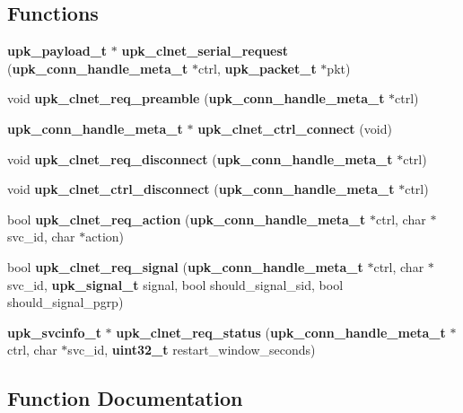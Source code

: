 \subsection*{Functions}
\begin{DoxyCompactItemize}
\item 
{\bf upk\_\-payload\_\-t} $\ast$ {\bf upk\_\-clnet\_\-serial\_\-request} ({\bf upk\_\-conn\_\-handle\_\-meta\_\-t} $\ast$ctrl, {\bf upk\_\-packet\_\-t} $\ast$pkt)
\item 
void {\bf upk\_\-clnet\_\-req\_\-preamble} ({\bf upk\_\-conn\_\-handle\_\-meta\_\-t} $\ast$ctrl)
\item 
{\bf upk\_\-conn\_\-handle\_\-meta\_\-t} $\ast$ {\bf upk\_\-clnet\_\-ctrl\_\-connect} (void)
\item 
void {\bf upk\_\-clnet\_\-req\_\-disconnect} ({\bf upk\_\-conn\_\-handle\_\-meta\_\-t} $\ast$ctrl)
\item 
void {\bf upk\_\-clnet\_\-ctrl\_\-disconnect} ({\bf upk\_\-conn\_\-handle\_\-meta\_\-t} $\ast$ctrl)
\item 
bool {\bf upk\_\-clnet\_\-req\_\-action} ({\bf upk\_\-conn\_\-handle\_\-meta\_\-t} $\ast$ctrl, char $\ast$svc\_\-id, char $\ast$action)
\item 
bool {\bf upk\_\-clnet\_\-req\_\-signal} ({\bf upk\_\-conn\_\-handle\_\-meta\_\-t} $\ast$ctrl, char $\ast$svc\_\-id, {\bf upk\_\-signal\_\-t} signal, bool should\_\-signal\_\-sid, bool should\_\-signal\_\-pgrp)
\item 
{\bf upk\_\-svcinfo\_\-t} $\ast$ {\bf upk\_\-clnet\_\-req\_\-status} ({\bf upk\_\-conn\_\-handle\_\-meta\_\-t} $\ast$ctrl, char $\ast$svc\_\-id, {\bf uint32\_\-t} restart\_\-window\_\-seconds)
\end{DoxyCompactItemize}


\subsection{Function Documentation}
